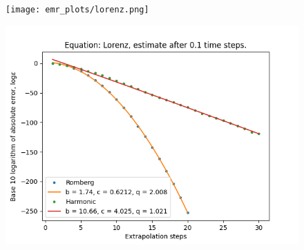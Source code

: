 \begin{figure}[H]
\centering
\begin{minipage}{0.45\textwidth}
\centering
\texttt{[image: emr\_plots/lorenz.png]}
\end{minipage}
\begin{minipage}{0.45\textwidth}
\centering
\includegraphics[scale=0.45]{emr_plots/lorenz_hp_steps.png}
\end{minipage}
\end{figure}

